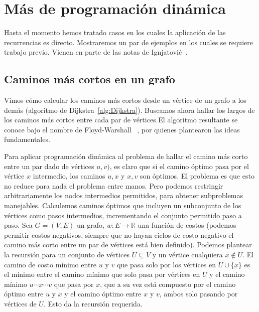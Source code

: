 

\chapter{Más de programación dinámica}
\label{cha:programacion-dinamica-cont}

  Hasta el momento hemos tratado casos
  en los cuales la aplicación de las recurrencias es directo.
  Mostraremos un par de ejemplos en los cuales se requiere trabajo previo.
  Vienen en parte de las notas de Ignjatović~\cite{ignjatovic16:_DP}.

\section{Caminos más cortos en un grafo}
\label{sec:shortest-paths}

  Vimos cómo calcular los caminos más cortos
  desde un vértice de un grafo a los demás
  (algoritmo de Dijkstra~\ref{alg:Dijkstra}).
  Buscamos ahora hallar los largos de los caminos más cortos
  entre cada par de vértices
  El algoritmo resultante se conoce bajo el nombre de Floyd-Warshall~%
    \cite{floyd62:_shortest_path, warshall62:_theo_boolean_matrices},
  por quienes plantearon las ideas fundamentales.

  Para aplicar programación dinámica al problema de hallar el camino más corto
  entre un par dado de vértices \(u, v)\),
  es claro que si el camino óptimo pasa por el vértice \(x\) intermedio,
  los caminos \(u, x\) y \(x, v\) son óptimos.
  El problema es que esto no reduce para nada el problema entre manos.
  Pero podemos restringir arbitrariamente los nodos intermedios permitidos,
  para obtener subproblemas manejables.
  Calculemos caminos óptimos que incluyen un subconjunto de los vértices
  como pasos intermedios,
  incrementando el conjunto permitido paso a paso.
  Sea \(G = (V, E)\) un grafo,
  \(w \colon E \to \mathbb{R}\) una función de costos
  (podemos permitir costos negativos,
   siempre que no hayan ciclos de costo negativo
   el camino más corto entre un par de vértices está bien definido).
  Podemos plantear la recursión
  para un conjunto de vértices \(U \subseteq V\)
  y un vértice cualquiera \(x \notin U\).
  El camino de costo mínimo entre \(u\) y \(v\)
  que pasa solo por los vértices en \(U \cup \{x\}\)
  es el mínimo entre el camino mínimo que solo pasa por vértices en \(U\)
  y el camino mínimo \(u \cdots x \cdots v\) que pasa por \(x\),
  que a su vez está compuesto por el camino óptimo entre \(u\) y \(x\)
  y el camino óptimo entre \(x\) y \(v\),
  ambos solo pasando por vértices de \(U\).
  Esto da la recursión requerida.

